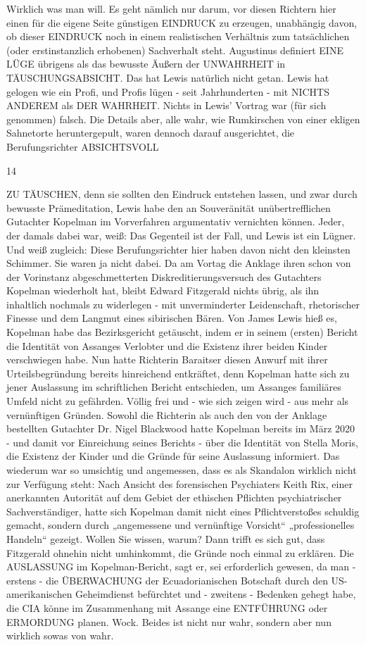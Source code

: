 \begin{multicols}{2}
Wirklich was man will. Es geht nämlich nur darum, vor
diesen Richtern hier einen für die eigene Seite günstigen
EINDRUCK zu erzeugen, unabhängig davon, ob dieser
EINDRUCK noch in einem realistischen Verhältnis zum
tatsächlichen (oder erstinstanzlich erhobenen) Sachverhalt steht.
Augustinus definiert EINE LÜGE übrigens als das bewusste Äußern der UNWAHRHEIT in TÄUSCHUNGSABSICHT. Das hat Lewis natürlich nicht getan. Lewis hat
gelogen wie ein Profi, und Profis lügen - seit Jahrhunderten - mit NICHTS ANDEREM als DER WAHRHEIT.
Nichts in Lewis’ Vortrag war (für sich genommen) falsch.
Die Details aber, alle wahr, wie Rumkirschen von einer
ekligen Sahnetorte heruntergepult, waren dennoch darauf ausgerichtet, die Berufungsrichter ABSICHTSVOLL

14

ZU TÄUSCHEN, denn sie sollten den Eindruck entstehen lassen, und zwar durch bewusste Prämeditation,
Lewis habe den an Souveränität unübertrefflichen Gutachter Kopelman im Vorverfahren argumentativ vernichten können. Jeder, der damals dabei war, weiß: Das
Gegenteil ist der Fall, und Lewis ist ein Lügner. Und weiß
zugleich: Diese Berufungsrichter hier haben davon nicht
den kleinsten Schimmer. Sie waren ja nicht dabei.
Da am Vortag die Anklage ihren schon von der Vorinstanz
abgeschmetterten Diskreditierungsversuch des Gutachters Kopelman wiederholt hat, bleibt Edward Fitzgerald
nichts übrig, als ihn inhaltlich nochmals zu widerlegen
- mit unverminderter Leidenschaft, rhetorischer Finesse
und dem Langmut eines sibirischen Bären. Von James
Lewis hieß es, Kopelman habe das Bezirksgericht getäuscht, indem er in seinem (ersten) Bericht die Identität von Assanges Verlobter und die Existenz ihrer beiden
Kinder verschwiegen habe. Nun hatte Richterin Baraitser diesen Anwurf mit ihrer Urteilsbegründung bereits
hinreichend entkräftet, denn Kopelman hatte sich zu jener Auslassung im schriftlichen Bericht entschieden, um
Assanges familiäres Umfeld nicht zu gefährden. Völlig
frei und - wie sich zeigen wird - aus mehr als vernünftigen Gründen. Sowohl die Richterin als auch den von der
Anklage bestellten Gutachter Dr. Nigel Blackwood hatte Kopelman bereits im März 2020 - und damit vor Einreichung seines Berichts - über die Identität von Stella
Moris, die Existenz der Kinder und die Gründe für seine
Auslassung informiert. Das wiederum war so umsichtig
und angemessen, dass es als Skandalon wirklich nicht
zur Verfügung steht: Nach Ansicht des forensischen Psychiaters Keith Rix, einer anerkannten Autorität auf dem
Gebiet der ethischen Pflichten psychiatrischer Sachverständiger, hatte sich Kopelman damit nicht eines
Pflichtverstoßes schuldig gemacht, sondern durch „angemessene und vernünftige Vorsicht“ „professionelles
Handeln“ gezeigt.
Wollen Sie wissen, warum? Dann trifft es sich gut, dass
Fitzgerald ohnehin nicht umhinkommt, die Gründe
noch einmal zu erklären. Die AUSLASSUNG im Kopelman-Bericht, sagt er, sei erforderlich gewesen, da man
- erstens - die ÜBERWACHUNG der Ecuadorianischen
Botschaft durch den US-amerikanischen Geheimdienst
befürchtet und - zweitens - Bedenken gehegt habe, die
CIA könne im Zusammenhang mit Assange eine ENTFÜHRUNG oder ERMORDUNG planen.
Wock. Beides ist nicht nur wahr, sondern aber nun wirklich sowas von wahr.


\end{multicols}
